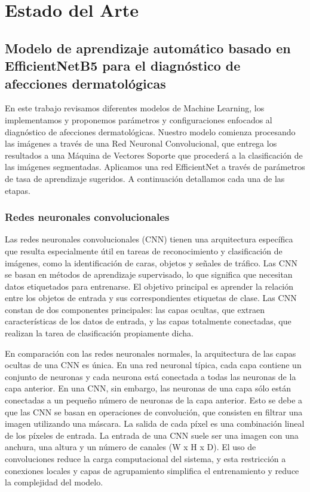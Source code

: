 \chapter{Estado del Arte}\label{chapter:state-of-the-art}

\section{Modelo de aprendizaje automático basado en EfficientNetB5 para el diagnóstico de afecciones dermatológicas}\label{sec:dev}
En este trabajo revisamos diferentes modelos de Machine Learning, los implementamos y proponemos parámetros y configuraciones enfocados al diagnóstico de afecciones dermatológicas. 
Nuestro modelo comienza procesando las imágenes a través de una Red Neuronal Convolucional, que entrega los resultados a una Máquina de Vectores Soporte que procederá a la clasificación de las imágenes segmentadas. 
Aplicamos una red EfficientNet a través de parámetros de tasa de aprendizaje sugeridos. A continuación detallamos cada una de las etapas. 

	\subsection{Redes neuronales convolucionales}\label{sub:cnn}
Las redes neuronales convolucionales (CNN) tienen una arquitectura específica que resulta especialmente útil en tareas de reconocimiento y clasificación de imágenes, como la identificación de caras, objetos y señales de tráfico. 
Las CNN se basan en métodos de aprendizaje supervisado, lo que significa que necesitan datos etiquetados para entrenarse. 
El objetivo principal es aprender la relación entre los objetos de entrada y sus correspondientes etiquetas de clase. 
Las CNN constan de dos componentes principales: las capas ocultas, que extraen características de los datos de entrada, y las capas totalmente conectadas, que realizan la tarea de clasificación propiamente dicha.

En comparación con las redes neuronales normales, la arquitectura de las capas ocultas de una CNN es única. 
En una red neuronal típica, cada capa contiene un conjunto de neuronas y cada neurona está conectada a todas las neuronas de la capa anterior. 
En una CNN, sin embargo, las neuronas de una capa sólo están conectadas a un pequeño número de neuronas de la capa anterior. 
Esto se debe a que las CNN se basan en operaciones de convolución, que consisten en filtrar una imagen utilizando una máscara. 
La salida de cada píxel es una combinación lineal de los píxeles de entrada. 
La entrada de una CNN suele ser una imagen con una anchura, una altura y un número de canales (W x H x D). 
El uso de convoluciones reduce la carga computacional del sistema, y esta restricción a conexiones locales y capas de agrupamiento simplifica el entrenamiento y reduce la complejidad del modelo.

